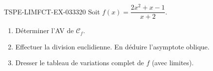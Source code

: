 \begin{exercice}{TSPE-LIMFCT-EX-033}{3}{20}
Soit $f(x) = \dfrac{2x^2 + x - 1}{x + 2}$.
\begin{enumerate}
  \item Déterminer l'AV de $\mathcal{C}_f$.
  \item Effectuer la division euclidienne. En déduire l'asymptote oblique.
  \item Dresser le tableau de variations complet de $f$ (avec limites).
\end{enumerate}
\end{exercice}
